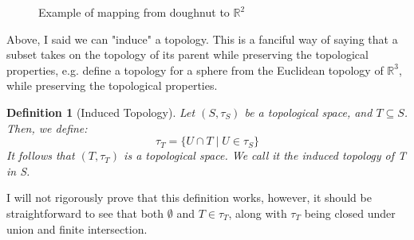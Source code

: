 \documentclass{article}
\newtheorem*{defn}{Definition}
\begin{document}
\begin{figure}[!htb]
    \caption{
        \label{fig:doughnut}
        Example of mapping from doughnut to $\mathbb{R}^2$ 
    }
\end{figure}

Above, I said we can "induce" a topology. This is a fanciful way of saying that
a subset takes on the topology of its parent while preserving the topological
properties, e.g. define a topology for a sphere from the Euclidean
topology of $\mathbb{R}^3$, while preserving the topological properties. 

\begin{defn}[Induced Topology]
    Let $(S, \tau_S)$ be a topological space, and $T \subseteq S$. Then, we
    define:
    $$\tau_T = \{U \cap T \mid U \in \tau_S \}$$
    It follows that $(T, \tau_T)$ is a topological space. We call it the induced
    topology of T in S.
\end{defn}

I will not rigorously prove that this definition works, however, it should be
straightforward to see that both $\emptyset$ and $T \in \tau_T$, along with
$\tau_T$ being closed under union and finite intersection.
\end{document}
